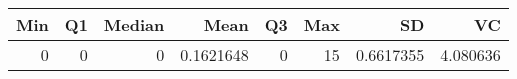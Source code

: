 
\begin{tabular}[t]{rrrrrrrr}
\toprule
Min & Q1 & Median & Mean & Q3 & Max & SD & VC\\
\midrule
0 & 0 & 0 & 0.1621648 & 0 & 15 & 0.6617355 & 4.080636\\
\bottomrule
\end{tabular}